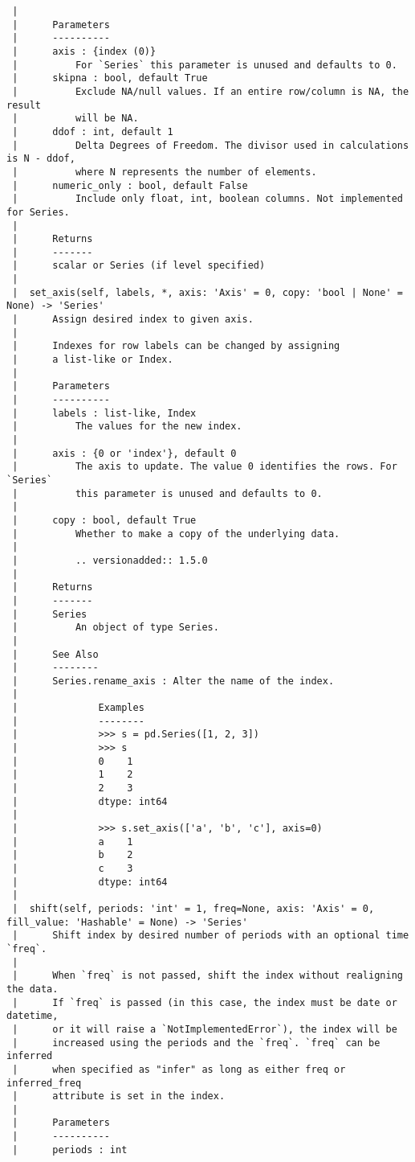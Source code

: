 \documentclass[
  letterpaper,
  DIV=11,
  numbers=noendperiod]{scrreprt}
\begin{document}
\begin{verbatim}
 |      
 |      Parameters
 |      ----------
 |      axis : {index (0)}
 |          For `Series` this parameter is unused and defaults to 0.
 |      skipna : bool, default True
 |          Exclude NA/null values. If an entire row/column is NA, the result
 |          will be NA.
 |      ddof : int, default 1
 |          Delta Degrees of Freedom. The divisor used in calculations is N - ddof,
 |          where N represents the number of elements.
 |      numeric_only : bool, default False
 |          Include only float, int, boolean columns. Not implemented for Series.
 |      
 |      Returns
 |      -------
 |      scalar or Series (if level specified)
 |  
 |  set_axis(self, labels, *, axis: 'Axis' = 0, copy: 'bool | None' = None) -> 'Series'
 |      Assign desired index to given axis.
 |      
 |      Indexes for row labels can be changed by assigning
 |      a list-like or Index.
 |      
 |      Parameters
 |      ----------
 |      labels : list-like, Index
 |          The values for the new index.
 |      
 |      axis : {0 or 'index'}, default 0
 |          The axis to update. The value 0 identifies the rows. For `Series`
 |          this parameter is unused and defaults to 0.
 |      
 |      copy : bool, default True
 |          Whether to make a copy of the underlying data.
 |      
 |          .. versionadded:: 1.5.0
 |      
 |      Returns
 |      -------
 |      Series
 |          An object of type Series.
 |      
 |      See Also
 |      --------
 |      Series.rename_axis : Alter the name of the index.
 |      
 |              Examples
 |              --------
 |              >>> s = pd.Series([1, 2, 3])
 |              >>> s
 |              0    1
 |              1    2
 |              2    3
 |              dtype: int64
 |      
 |              >>> s.set_axis(['a', 'b', 'c'], axis=0)
 |              a    1
 |              b    2
 |              c    3
 |              dtype: int64
 |  
 |  shift(self, periods: 'int' = 1, freq=None, axis: 'Axis' = 0, fill_value: 'Hashable' = None) -> 'Series'
 |      Shift index by desired number of periods with an optional time `freq`.
 |      
 |      When `freq` is not passed, shift the index without realigning the data.
 |      If `freq` is passed (in this case, the index must be date or datetime,
 |      or it will raise a `NotImplementedError`), the index will be
 |      increased using the periods and the `freq`. `freq` can be inferred
 |      when specified as "infer" as long as either freq or inferred_freq
 |      attribute is set in the index.
 |      
 |      Parameters
 |      ----------
 |      periods : int

\end{verbatim}
\end{document}
